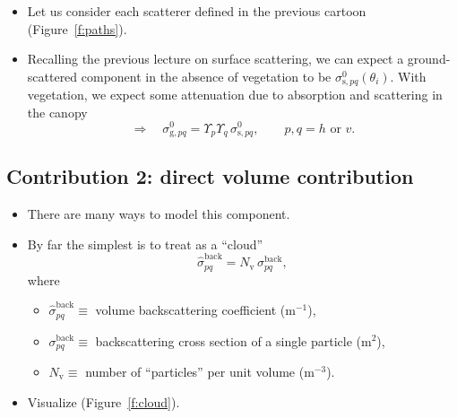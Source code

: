 \documentclass[11pt, oneside]{article}
\newcommand{\sback}{\hat{\sigma}^\mathrm{back}_{pq}}
\begin{document}
\begin{itemize}
	\item Let us consider each scatterer defined in the previous cartoon (Figure~\ref{f:paths}).
	\item Recalling the previous lecture on surface scattering, we can expect a ground-scattered component in the absence of vegetation to be $\sigma^0_{\mathrm{s},pq}(\theta_i)$. With vegetation, we expect some attenuation due to absorption and scattering in the canopy
	\begin{equation}
		\label{e:sg}
		\Rightarrow\quad \sigma^0_{\mathrm{g},pq} = \Upsilon_p\Upsilon_q\,\sigma^0_{\mathrm{s},pq}, \qquad p,q = h \text{ or } v.
	\end{equation}
\end{itemize}

\subsection{Contribution 2: direct volume contribution}
\label{s:direct}

\begin{itemize}
	\item There are many ways to model this component.
	\item By far the simplest is to treat as a ``cloud''
	\begin{equation}
		\label{e:cloud}
		\sback = N_\mathrm{v}\,\sigma^\mathrm{back}_{pq},
	\end{equation}
	where
	\begin{itemize}
		\item[] $\sback \equiv$ volume backscattering coefficient (m$^{-1}$),
		\item[] $\sigma^\mathrm{back}_{pq} \equiv$ backscattering cross section of a single particle (m$^2$),
		\item[] $N_\mathrm{v} \equiv$ number of ``particles'' per unit volume (m$^{-3}$).
	\end{itemize}
	\item Visualize (Figure~\ref{f:cloud}).
\end{itemize}
\end{document}
